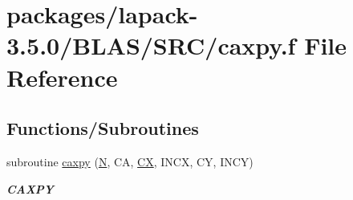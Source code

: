\hypertarget{lapack-3_85_80_2BLAS_2SRC_2caxpy_8f}{}\section{packages/lapack-\/3.5.0/\+B\+L\+A\+S/\+S\+R\+C/caxpy.f File Reference}
\label{lapack-3_85_80_2BLAS_2SRC_2caxpy_8f}
\subsection*{Functions/\+Subroutines}
\begin{DoxyCompactItemize}
\item 
subroutine \hyperlink{group__complex__blas__level1_ga9605cb98791e2038fd89aaef63a31be1}{caxpy} (\hyperlink{polmisc_8c_a0240ac851181b84ac374872dc5434ee4}{N}, C\+A, \hyperlink{scsum1_8c_a5a76da95c549c41790389a76e12fdcb5}{C\+X}, I\+N\+C\+X, C\+Y, I\+N\+C\+Y)
\begin{DoxyCompactList}\small\item\em {\bfseries C\+A\+X\+P\+Y} \end{DoxyCompactList}\end{DoxyCompactItemize}
